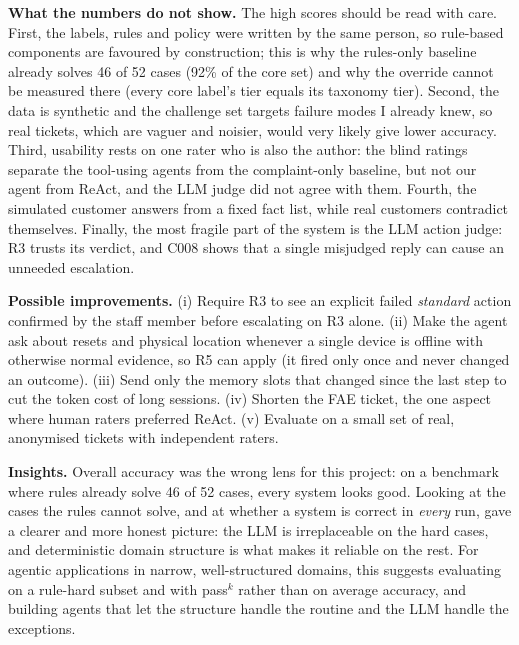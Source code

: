 \documentclass[12pt,a4paper]{article}
\begin{document}
\textbf{What the numbers do not show.} The high scores should be read with care. First, the labels, rules and
policy were written by the same person, so rule-based components are favoured by construction; this is why the
rules-only baseline already solves 46 of 52 cases (92\% of the core set) and why the override cannot be measured there (every core label's tier equals
its taxonomy tier). Second, the data is synthetic and the challenge set targets failure modes I already knew, so real
tickets, which are vaguer and noisier, would very likely give lower accuracy. Third, usability rests on one rater who is also the author: the blind ratings separate the
tool-using agents from the complaint-only baseline, but not our agent from ReAct, and the LLM judge did not agree
with them. Fourth, the simulated customer answers from a fixed fact list, while real
customers contradict themselves. Finally, the most fragile part of the system is the LLM action judge: R3 trusts its
verdict, and C008 shows that a single misjudged reply can cause an unneeded escalation.

\textbf{Possible improvements.} (i) Require R3 to see an explicit failed \emph{standard} action confirmed by the
staff member before escalating on R3 alone. (ii) Make the agent ask about resets and physical location whenever a
single device is offline with otherwise normal evidence, so R5 can apply (it fired only once and never changed an
outcome). (iii) Send only the memory slots that changed since the last step to cut the token cost of long sessions.
(iv) Shorten the FAE ticket, the one aspect where human raters preferred ReAct. (v) Evaluate on a small set of
real, anonymised tickets with independent raters.

\textbf{Insights.} Overall accuracy was the wrong lens for this project: on a benchmark where rules already solve
46 of 52 cases, every system looks good. Looking at the cases the rules cannot solve, and at whether a system is
correct in \emph{every} run, gave a clearer and more honest picture: the LLM is irreplaceable on the hard cases, and
deterministic domain structure is what makes it reliable on the rest. For agentic applications in narrow,
well-structured domains, this suggests evaluating on a rule-hard subset and with pass$^k$ rather than on average
accuracy, and building agents that let the structure handle the routine and the LLM handle the exceptions.
\end{document}
